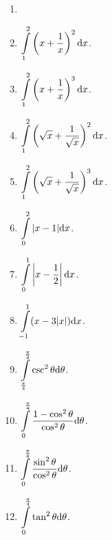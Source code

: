 \begin{multicols}{3}
\begin{enumerate}[ref={\fcProblemRef}]
\item 
\item $\displaystyle \int\limits_{1}^{2} \left(x + \frac{1}{x} \right)^2 {\normalfont \text{d}} x$.

\item $\displaystyle \int\limits_{1}^{2} \left(x + \frac{1}{x} \right)^3 {\normalfont \text{d}} x$.

\item $\displaystyle \int\limits_{1}^{2} \left(\sqrt{x} + \frac{1}{\sqrt{x}} \right)^2 {\normalfont \text{d}} x$.

\item $\displaystyle \int\limits_{1}^{2} \left(\sqrt{x} +\frac{1}{\sqrt{x}} \right)^3 {\normalfont \text{d}} x$.

\item $\displaystyle \int\limits_{0}^{2}|x-1| {\normalfont \text{d}} x$.

\item \label{problemIntegralAbsoluteValuexminushalf} $\displaystyle \int\limits_{0}^{1} \left|x-\frac{1}{2}\right| {\normalfont \text{d}} x$.

\item $\displaystyle \int\limits_{-1}^{1}(x-3|x|) {\normalfont \text{d}} x$.

\item $\displaystyle \int\limits_{\frac{\pi}{4}}^{\frac{\pi}{2}} \csc^2\theta {\normalfont \text{d}} \theta$.

\answer{$\left[ \right]_{}^{}=$}
\item $\displaystyle \int\limits_{0}^{\frac{\pi}{4}}\frac{1-\cos^2\theta}{\cos^2\theta} {\normalfont \text{d}} \theta$.

\answer{$\left[ \right]_{}^{}=$}
\item $\displaystyle \int\limits_{0}^{\frac{\pi}{4}}\frac{\sin^2\theta}{\cos^2\theta} {\normalfont \text{d}} \theta$.

\answer{$\left[ \right]_{}^{}=$}
\item $\displaystyle \int\limits_{0}^{\frac{\pi}{4}}\tan^2\theta {\normalfont \text{d}} \theta$.


\end{enumerate}
\end{multicols}
